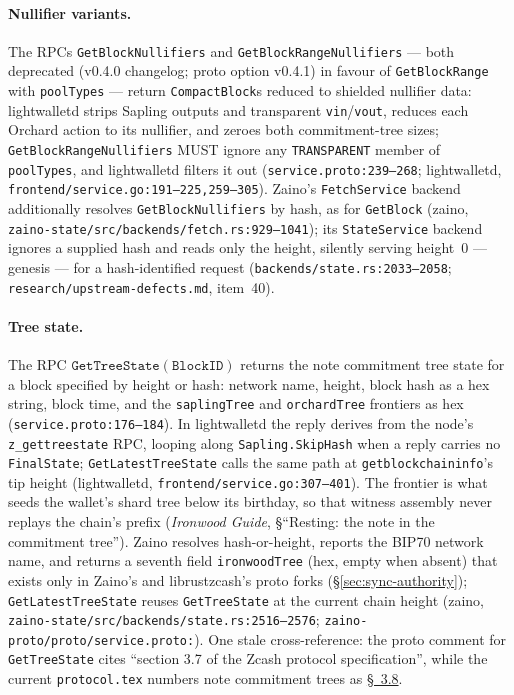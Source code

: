 \documentclass[11pt,a4paper]{article}
\theoremstyle{definition}
\begin{document}
\paragraph{Nullifier variants.} The RPCs \texttt{GetBlockNullifiers}
and \texttt{GetBlockRangeNullifiers} ---
both deprecated (v0.4.0 changelog; proto option v0.4.1) in favour of
\texttt{GetBlockRange} with
\texttt{poolTypes} --- return \texttt{CompactBlock}s reduced to shielded
nullifier data: lightwalletd strips Sapling outputs and transparent
\texttt{vin}/\texttt{vout}, reduces each Orchard action to its nullifier,
and zeroes both commitment-tree sizes; \texttt{GetBlockRangeNullifiers}
MUST ignore any \texttt{TRANSPARENT} member of \texttt{poolTypes}, and
lightwalletd filters it out (\texttt{service.proto:239--268};
\textsf{lightwalletd}, \texttt{frontend/service.go:191--225,259--305}).
Zaino's \texttt{FetchService} backend additionally resolves
\texttt{GetBlockNullifiers} by hash, as for \texttt{GetBlock}
(\textsf{zaino},
\texttt{zaino-state/src/}\allowbreak\texttt{backends/fetch.rs:929--1041});
its \texttt{StateService} backend ignores a supplied hash and reads only
the height, silently serving height~0 --- genesis --- for a
hash-identified request
(\texttt{backends/}\allowbreak\texttt{state.rs:2033--2058};
\texttt{research/}\allowbreak\texttt{upstream-defects.md}, item~40).

\paragraph{Tree state.} The RPC
$\mathtt{GetTreeState}(\mathtt{BlockID})$ returns the note commitment tree
state for a block specified by height or hash: network name, height, block
hash as a hex string, block time, and the \texttt{saplingTree} and
\texttt{orchardTree} frontiers as hex (\texttt{service.proto:176--184}).
In lightwalletd the reply derives from the node's
\texttt{z\_gettreestate} RPC,
looping along \texttt{Sapling.SkipHash} when a reply carries no
\texttt{FinalState}; \texttt{GetLatestTreeState} calls the same path at
\texttt{getblockchaininfo}'s tip height (\textsf{lightwalletd},
\texttt{frontend/service.go:307--401}). The frontier is what seeds the
wallet's shard tree below its birthday, so that witness assembly never
replays the chain's prefix (\emph{Ironwood Guide}, \S``Resting: the note in the
commitment tree''). Zaino resolves
hash-or-height, reports the BIP70 network name, and returns a seventh
field \texttt{ironwoodTree} (hex, empty when absent) that exists only in
Zaino's and librustzcash's proto forks (\S\ref{sec:sync-authority});
\texttt{GetLatestTreeState} reuses \texttt{GetTreeState} at the current
chain height (\textsf{zaino},
\texttt{zaino-state/src/backends/\allowbreak state.rs:2516--2576};
\texttt{zaino-proto/proto/\allowbreak service.proto:}). One
stale
cross-reference:
the proto comment for \texttt{GetTreeState} cites ``section 3.7 of the
Zcash protocol specification'', while the current
\texttt{protocol.tex} numbers note commitment trees as \href{https://zips.z.cash/protocol/protocol.pdf\#notecommitmenttrees}{\S~3.8}.
\end{document}
